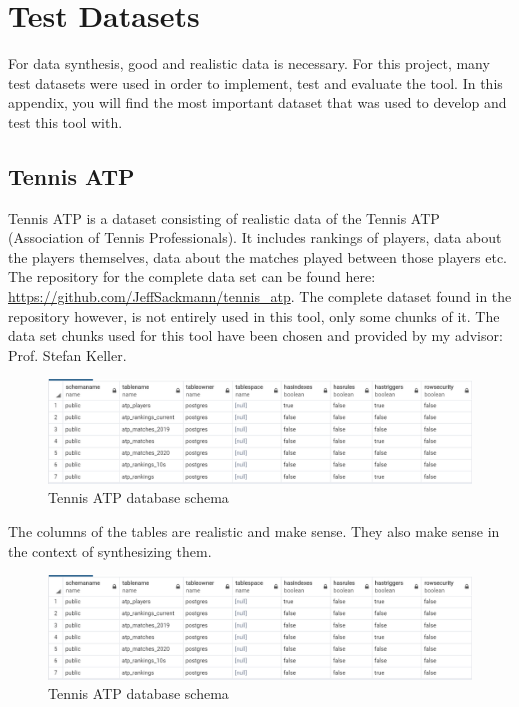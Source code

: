 \chapter{Test Datasets}
For data synthesis, good and realistic data is necessary. For this project, many test datasets were used in order to implement, test and evaluate the tool. In this appendix, you will find the most important dataset that was used to develop and test this tool with.
\section{Tennis ATP}
\label{sec:tennis_atp_dataset}
Tennis ATP is a dataset consisting of realistic data of the Tennis ATP (Association of Tennis Professionals). It includes rankings of players, data about the players themselves, data about the matches played between those players etc. \\
\newline
The repository for the complete data set can be found here: \url{https://github.com/JeffSackmann/tennis\_atp}. The complete dataset found in the repository however,  is not entirely used in this tool, only some chunks of it. The data set chunks used for this tool have been chosen and provided by my advisor: Prof. Stefan Keller.\\
\begin{figure}[H]
	\includegraphics[width=\linewidth]{./Figures/Appendices/tennis_atp_schema.png}
	\caption{Tennis ATP database schema}
\end{figure}
\newpage
The columns of the tables are realistic and make sense. They also make sense in the context of synthesizing them.
\begin{figure}[H]
	\includegraphics[width=\linewidth]{./Figures/Appendices/tennis_atp_schema.png}
	\caption{Tennis ATP database schema}
\end{figure}
